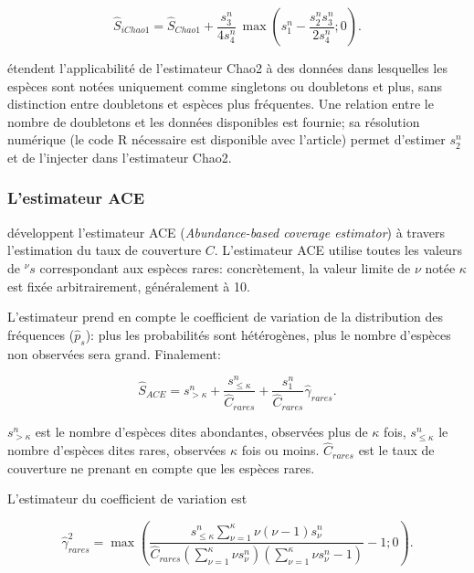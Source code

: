 \documentclass[
  11pt,
  french,
  a4paper,
  extrafontsizes,onecolumn,openright
  ]{memoir}
\begin{document}
\begin{equation}
  \label{eq:iChao1}
  {\hat{S}}_\mathit{iChao1} 
  = {\hat{S}}_\mathit{Chao1} 
  + \frac{s^{n}_{3}}{4s^{n}_{4}}\,
  \max\left(s^{n}_{1}-\frac{s^{n}_{2}s^{n}_{3}}{2s^{n}_{4}};0\right).
\end{equation}

\textcite{Chao2017} étendent l'applicabilité de l'estimateur Chao2 à des données dans lesquelles les espèces sont notées uniquement comme singletons ou doubletons et plus, sans distinction entre doubletons et espèces plus fréquentes.
Une relation entre le nombre de doubletons et les données disponibles est fournie; sa résolution numérique (le code R nécessaire est disponible avec l'article) permet d'estimer \(s^{n}_{2}\) et de l'injecter dans l'estimateur Chao2.

\subsubsection{L'estimateur ACE}\label{lestimateur-ace}

\textcite{Chao1992} développent l'estimateur ACE (\emph{Abundance-based coverage estimator}) à travers l'estimation du taux de couverture \(C\).
L'estimateur ACE utilise toutes les valeurs de \(^{\nu }s\) correspondant aux espèces rares: concrètement, la valeur limite de \(\nu\) notée \(\kappa\) est fixée arbitrairement, généralement à 10.

L'estimateur prend en compte le coefficient de variation de la distribution des fréquences (\({\hat{p}}_s\)): plus les probabilités sont hétérogènes, plus le nombre d'espèces non observées sera grand.
Finalement:

\begin{equation}
  \label{eq:ACE}
  \hat{S}_{\mathit{ACE}} = s^{n}_{>\kappa} + \frac{s^{n}_{\le\kappa}}{\hat{C}_\mathit{rares}}+\frac{s^{n}_{1}}{{\hat{C}}_\mathit{rares}}{\hat{\gamma}}_\mathit{rares}.
\end{equation}

\(s^{n}_{>\kappa}\) est le nombre d'espèces dites abondantes, observées plus de \(\kappa\) fois, \(s^{n}_{\le\kappa}\) le nombre d'espèces dites rares, observées \(\kappa\) fois ou moins.
\(\hat{C}_\mathit{rares}\) est le taux de couverture ne prenant en compte que les espèces rares.

L'estimateur du coefficient de variation est

\begin{equation}
  \label{eq:ACEcv}
  \hat{\gamma}^{2}_\mathit{rares} = \max\left(\frac{s^{n}_{\le\kappa}\sum^{\kappa}_{\nu=1}{\nu\left(\nu-1\right){s^{n}_{\nu}}}}{\hat{C}_\mathit{rares}\left(\sum^{\kappa}_{\nu=1}{\nu s^{n}_{\nu}}\right)\left(\sum^{\kappa}_{\nu=1}{\nu s^{n}_{\nu}}-1\right)}-1; 0\right).
\end{equation}
\end{document}

